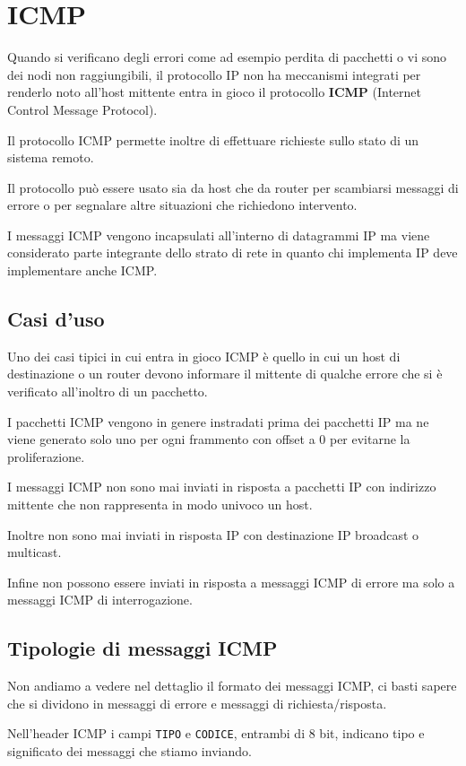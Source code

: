 \section{ICMP}
Quando si verificano degli errori come ad esempio perdita di pacchetti
o vi sono dei nodi non raggiungibili, il protocollo IP non ha 
meccanismi integrati per renderlo noto all'host mittente entra in gioco
il protocollo \textbf{ICMP} (Internet Control Message Protocol).

Il protocollo ICMP permette inoltre di effettuare richieste sullo stato
di un sistema remoto.

Il protocollo può essere usato sia da host che da router per scambiarsi
messaggi di errore o per segnalare altre situazioni che richiedono
intervento.

I messaggi ICMP vengono incapsulati all'interno di datagrammi IP ma
viene considerato parte integrante dello strato di rete in quanto chi
implementa IP deve implementare anche ICMP.

\subsection{Casi d'uso}
Uno dei casi tipici in cui entra in gioco ICMP è quello in cui un host
di destinazione o un router devono informare il mittente di qualche
errore che si è verificato all'inoltro di un pacchetto.

I pacchetti ICMP vengono in genere instradati prima dei pacchetti IP
ma ne viene generato solo uno per ogni frammento con offset a 0 per
evitarne la proliferazione.

I messaggi ICMP non sono mai inviati in risposta a pacchetti IP con 
indirizzo mittente che non rappresenta in modo univoco un host.

Inoltre non sono mai inviati in risposta IP con destinazione IP 
broadcast o multicast.

Infine non possono essere inviati in risposta a messaggi ICMP di errore
ma solo a messaggi ICMP di interrogazione.

\subsection{Tipologie di messaggi ICMP}
Non andiamo a vedere nel dettaglio il formato dei messaggi ICMP, ci
basti sapere che si dividono in messaggi di errore e messaggi di 
richiesta/risposta.

Nell'header ICMP i campi \verb|TIPO| e \verb|CODICE|, entrambi di 8
bit, indicano tipo e significato dei messaggi che stiamo inviando.

